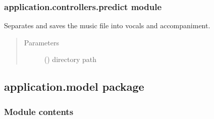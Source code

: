 \documentclass[letterpaper,10pt,english,openany,oneside]{sphinxmanual}
\begin{document}
\subsubsection{application.controllers.predict module}
\label{\detokenize{docs/source/application.controllers:module-application.controllers.predict}}\label{\detokenize{docs/source/application.controllers:application-controllers-predict-module}}

\begin{fulllineitems}
\label{\detokenize{docs/source/application.controllers:application.controllers.predict.separate_file}}
Separates and saves the music file into vocals and accompaniment.
\begin{quote}\begin{description}
\item[{Parameters}] \leavevmode
{} () \textendash{} directory path

\end{description}\end{quote}

\end{fulllineitems}



\subsection{application.model package}
\label{\detokenize{docs/source/application.model:application-model-package}}\label{\detokenize{docs/source/application.model::doc}}

\subsubsection{Module contents}
\label{\detokenize{docs/source/application.model:module-application.model}}\label{\detokenize{docs/source/application.model:module-contents}}
\end{document}
